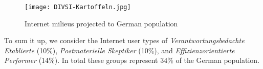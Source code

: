 \begin{figure}[hHtbp]
\centering
\texttt{[image: DIVSI-Kartoffeln.jpg]}
\caption{Internet milieus projected to German population~\cite{divsi2012divsi}}
\label{fig:divsi_kartoffeln}
\end{figure}
To sum it up, we consider the Internet user types of \textit{Verantwortungsbedachte Etablierte} (10\%),  \textit{Postmaterielle Skeptiker} (10\%), and \textit{Effizienzorientierte Performer} (14\%). In total these groups represent 34\% of the German population.
